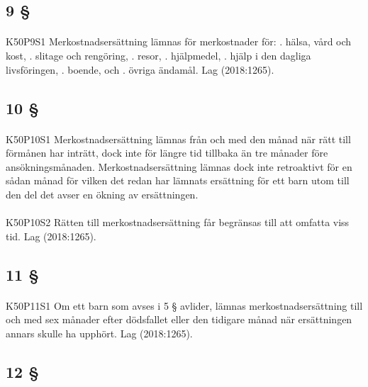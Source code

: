 \documentclass[a4paper,notitlepage,openany,10pt]{book}
\begin{document}
\subsection*{9 §}
\paragraph*{}
{\tiny K50P9S1}
Merkostnadsersättning lämnas för merkostnader för:
. hälsa, vård och kost,
. slitage och rengöring,
. resor,
. hjälpmedel,
. hjälp i den dagliga livsföringen,
. boende, och
. övriga ändamål.
Lag (2018:1265).
\subsection*{10 §}
\paragraph*{}
{\tiny K50P10S1}
Merkostnadsersättning lämnas från och med den månad när rätt till förmånen har inträtt, dock inte för längre tid tillbaka än tre månader före ansökningsmånaden. Merkostnadsersättning lämnas dock inte retroaktivt för en sådan månad för vilken det redan har lämnats ersättning för ett barn utom till den del det avser en ökning av ersättningen.
\paragraph*{}
{\tiny K50P10S2}
Rätten till merkostnadsersättning får begränsas till att omfatta viss tid.
Lag (2018:1265).
\subsection*{11 §}
\paragraph*{}
{\tiny K50P11S1}
Om ett barn som avses i 5 § avlider, lämnas merkostnadsersättning till och med sex månader efter dödsfallet eller den tidigare månad när ersättningen annars skulle ha upphört.
Lag (2018:1265).
\subsection*{12 §}
\end{document}
